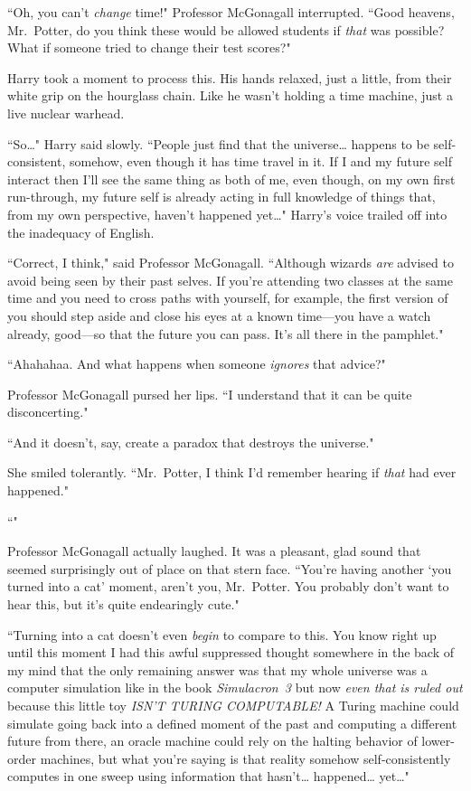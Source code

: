 ``Oh, you can't \emph{change} time!" Professor McGonagall interrupted. ``Good heavens, Mr.~Potter, do you think these would be allowed students if \emph{that} was possible? What if someone tried to change their test scores?"

Harry took a moment to process this. His hands relaxed, just a little, from their white grip on the hourglass chain. Like he wasn't holding a time machine, just a live nuclear warhead.

``So{\ldots}" Harry said slowly. ``People just find that the universe{\ldots} happens to be self-consistent, somehow, even though it has time travel in it. If I and my future self interact then I'll see the same thing as both of me, even though, on my own first run-through, my future self is already acting in full knowledge of things that, from my own perspective, haven't happened yet{\ldots}" Harry's voice trailed off into the inadequacy of English.

``Correct, I think," said Professor McGonagall. ``Although wizards \emph{are} advised to avoid being seen by their past selves. If you're attending two classes at the same time and you need to cross paths with yourself, for example, the first version of you should step aside and close his eyes at a known time---you have a watch already, good---so that the future you can pass. It's all there in the pamphlet."

``Ahahahaa. And what happens when someone \emph{ignores} that advice?"

Professor McGonagall pursed her lips. ``I understand that it can be quite disconcerting."

``And it doesn't, say, create a paradox that destroys the universe."

She smiled tolerantly. ``Mr.~Potter, I think I'd remember hearing if \emph{that} had ever happened."

``"

Professor McGonagall actually laughed. It was a pleasant, glad sound that seemed surprisingly out of place on that stern face. ``You're having another `you turned into a cat' moment, aren't you, Mr.~Potter. You probably don't want to hear this, but it's quite endearingly cute."

``Turning into a cat doesn't even \emph{begin} to compare to this. You know right up until this moment I had this awful suppressed thought somewhere in the back of my mind that the only remaining answer was that my whole universe was a computer simulation like in the book \emph{Simulacron~3} but now \emph{even that is ruled out} because this little toy \emph{ISN'T TURING COMPUTABLE!} A Turing machine could simulate going back into a defined moment of the past and computing a different future from there, an oracle machine could rely on the halting behavior of lower-order machines, but what you're saying is that reality somehow self-consistently computes in one sweep using information that hasn't{\ldots} happened{\ldots} yet{\ldots}"

